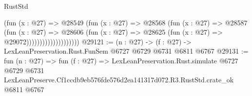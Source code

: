 \begin{lexlean}{RustStd}
\begin{coremodule}
                                (fun (x : @27) =>
                                @28549
                                  (fun (x : @27) =>
                                  @28568
                                    (fun (x : @27) =>
                                    @28587
                                      (fun (x : @27) =>
                                      @28606
                                        (fun (x : @27) =>
                                        @28625 (fun (x : @27) => @29072))))))))))))))))))))
@29121 := (n : @27) -> (f : @27) -> LexLeanPreservation.Rust.FunSem @6727 @6729 @6731 @6811 @6767
@29131 := fun (n : @27) =>
  fun (f : @27) =>
  LexLeanPreservation.Rust.simulate
    @6727
    @6729
    @6731
    LexLeanPreserve.Cf1ccdb9eb576fde576d2ea141317d072.R3.RustStd.crate_ok
    @6811
    @6767
\end{coremodule}
\end{lexlean}
